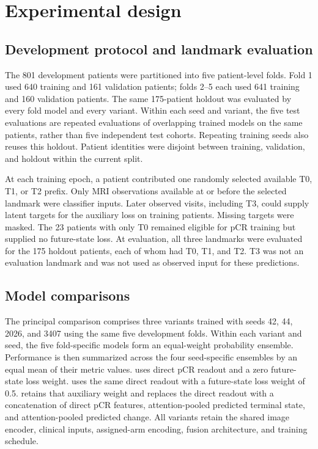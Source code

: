 \section{Experimental design}
\label{sec:experiments}
\subsection{Development protocol and landmark evaluation}
The 801 development patients were partitioned into five patient-level folds. Fold 1 used 640 training and 161 validation patients; folds 2--5 each used 641 training and 160 validation patients. The same 175-patient holdout was evaluated by every fold model and every variant. Within each seed and variant, the five test evaluations are repeated evaluations of overlapping trained models on the same patients, rather than five independent test cohorts. Repeating training seeds also reuses this holdout. Patient identities were disjoint between training, validation, and holdout within the current split.

At each training epoch, a patient contributed one randomly selected available T0, T1, or T2 prefix. Only MRI observations available at or before the selected landmark were classifier inputs. Later observed visits, including T3, could supply latent targets for the auxiliary loss on training patients. Missing targets were masked. The 23 patients with only T0 remained eligible for pCR training but supplied no future-state loss. At evaluation, all three landmarks were evaluated for the 175 holdout patients, each of whom had T0, T1, and T2. T3 was not an evaluation landmark and was not used as observed input for these predictions.

\subsection{Model comparisons}
The principal comparison comprises three variants trained with seeds 42, 44, 2026, and 3407 using the same five development folds. Within each variant and seed, the five fold-specific models form an equal-weight probability ensemble. Performance is then summarized across the four seed-specific ensembles by an equal mean of their metric values. \nojepa{} uses direct pCR readout and a zero future-state loss weight. \direct{} uses the same direct readout with a future-state loss weight of 0.5. \fullmodel{} retains that auxiliary weight and replaces the direct readout with a concatenation of direct pCR features, attention-pooled predicted terminal state, and attention-pooled predicted change. All variants retain the shared image encoder, clinical inputs, assigned-arm encoding, fusion architecture, and training schedule.


